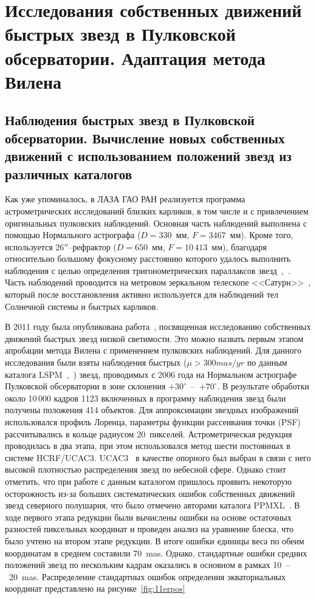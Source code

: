 \chapter{Исследования собственных движений быстрых звезд в Пулковcкой обсерватории. Адаптация метода Вилена} \label{ch:ch3}
\section{Наблюдения быстрых звезд в Пулковской обсерватории. Вычисление новых собственных движений с использованием положений звезд из различных каталогов} \label{sec:ch3/sect1}
Как уже упоминалось, в ЛАЗА ГАО РАН  реализуется программа астрометрических исследований близких карликов, в том числе и с привлечением оригинальных пулковских наблюдений. Основная часть наблюдений выполнена с помощью Нормального астрографа ($D=330$~мм, $F=3467$~мм).  Кроме того, используется  26$''$--рефрактор ($D=650$~мм, $F=10\,413$~мм), благодаря относительно большому фокусному расстоянию которого удалось выполнить наблюдения с целью определения тригонометрических параллаксов звезд~\cite{2010AstL...36..576K},~\cite{2013MNRAS.435.1083K}. Часть наблюдений проводится на метровом зеркальном телескопе <<Сатурн>>~\cite{2015arXiv151101642K}, который после восстановления активно используется для наблюдений тел Солнечной системы и быстрых карликов.

В 2011 году была опубликована работа~\cite{2011AstL...37..420K}, посвященная исследованию собственных движений быстрых звезд низкой светимости. Это можно назвать первым этапом апробации метода Вилена с применением пулковских наблюдений. Для данного исследования были взяты наблюдения быстрых ($\mu>300 mas/yr$ по данным каталога LSPM~\cite{2005AJ....129.1483L},~\cite{2008IAUS..248...74L}) звезд, проводимых с 2006 года на Нормальном астрографе Пулковской обсерватории в зоне склонения $+30^{\circ}$~--~$+70^{\circ}$. В результате обработки около 10\,000 кадров 1123 включенных в программу наблюдения звезд были получены положения 414 объектов. Для аппроксимации звездных изображений использовался профиль Лоренца, параметры функции рассеивания точки (PSF) рассчитывались в кольце радиусом 20~пикселей. Астрометрическая редукция проводилась в два этапа, при этом использовался метод шести постоянных в системе  HCRF/UCAC3. UCAC3~\cite{2010AJ....139.2184Z} в качестве опорного был выбран в связи с него высокой плотностью распределения звезд по небесной сфере. Однако стоит отметить, что при работе с данным каталогом пришлось проявить некоторую осторожность из-за больших систематических ошибок собственных движений звезд северного полушария, что было отмечено авторами  каталога PPMXL~\cite{2010AJ....139.2440R}. В ходе первого этапа редукции были вычислены ошибки на основе остаточных разностей пиксельных координат и проведен анализ на уравнение блеска, что было учтено на втором этапе редукции. В итоге ошибки единицы веса по обеим координатам в среднем составили 70~mas. Однако, стандартные ошибки средних положений звезд по нескольким кадрам оказались в основном в рамках 10~--~20~mas. Распределение стандартных ошибок определения экваториальных координат представлено на рисунке~\ref{fig:11erpos}

